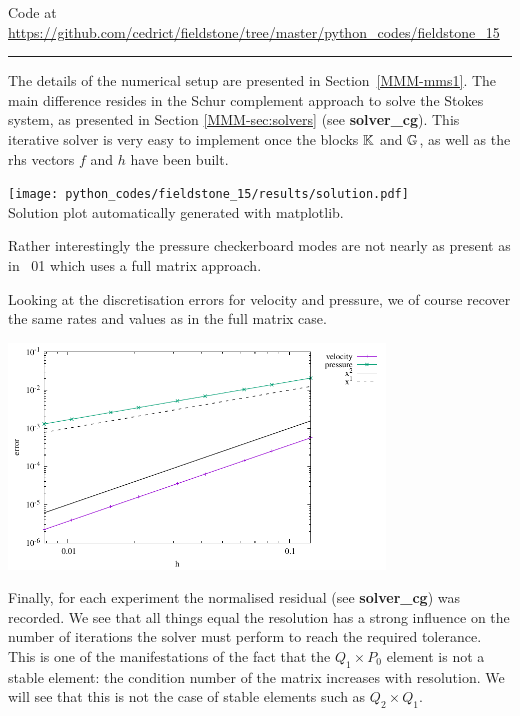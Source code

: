 

\begin{center}
Code at \url{https://github.com/cedrict/fieldstone/tree/master/python_codes/fieldstone_15}
\end{center}

\par\noindent\rule{\textwidth}{0.4pt}

The details of the numerical setup are presented in Section~\ref{MMM-mms1}.
The main difference resides in the Schur complement approach to solve the 
Stokes system, as presented in Section \ref{MMM-sec:solvers} (see {\bf solver\_cg}).
This iterative solver is very easy to implement once the blocks ${\mathbb{K}}$ and ${\mathbb{G}}$, 
as well as the rhs vectors $f$ and $h$ have been built. 

\begin{center}
\texttt{[image: python\_codes/fieldstone\_15/results/solution.pdf]}\\
{\captionfont Solution plot automatically generated with matplotlib.}
\end{center}

Rather interestingly the pressure checkerboard modes are not nearly as present as 
in \stone~01 which uses a full matrix approach. 

Looking at the discretisation errors for velocity and pressure, we 
of course recover the same rates and values as in the full matrix case.

\begin{center}
\includegraphics[width=10cm]{python_codes/fieldstone_15/results/errors.pdf}
\end{center}

Finally, for each experiment the normalised residual (see {\bf solver\_cg}) was recorded. We see that 
all things equal the resolution has a strong influence on the number of iterations the solver must
perform to reach the required tolerance. This is one of the manifestations of the fact that the 
$Q_1 \times P_0$ element is not a stable element: the condition number of the matrix increases with 
resolution. We will see that this is not the case of stable elements such as $Q_2\times Q_1$.

